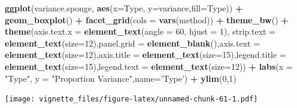 \documentclass[]{book}
\newenvironment{Shaded}{\begin{snugshade}}{\end{snugshade}}
\newcommand{\KeywordTok}[1]{\textcolor[rgb]{0.13,0.29,0.53}{\textbf{#1}}}
\newcommand{\DataTypeTok}[1]{\textcolor[rgb]{0.13,0.29,0.53}{#1}}
\newcommand{\DecValTok}[1]{\textcolor[rgb]{0.00,0.00,0.81}{#1}}
\newcommand{\StringTok}[1]{\textcolor[rgb]{0.31,0.60,0.02}{#1}}
\newcommand{\OperatorTok}[1]{\textcolor[rgb]{0.81,0.36,0.00}{\textbf{#1}}}
\newcommand{\NormalTok}[1]{#1}
\begin{document}
\begin{Shaded}
\begin{Highlighting}[]
\KeywordTok{ggplot}\NormalTok{(variance.sponge, }\KeywordTok{aes}\NormalTok{(}\DataTypeTok{x=}\NormalTok{Type, }\DataTypeTok{y=}\NormalTok{variance,}\DataTypeTok{fill=}\NormalTok{Type)) }\OperatorTok{+}\StringTok{ }\KeywordTok{geom_boxplot}\NormalTok{() }\OperatorTok{+}\StringTok{ }\KeywordTok{facet_grid}\NormalTok{(}\DataTypeTok{cols =} \KeywordTok{vars}\NormalTok{(method)) }\OperatorTok{+}\StringTok{ }\KeywordTok{theme_bw}\NormalTok{() }\OperatorTok{+}\StringTok{ }\KeywordTok{theme}\NormalTok{(}\DataTypeTok{axis.text.x =} \KeywordTok{element_text}\NormalTok{(}\DataTypeTok{angle =} \DecValTok{60}\NormalTok{, }\DataTypeTok{hjust =} \DecValTok{1}\NormalTok{), }\DataTypeTok{strip.text =} \KeywordTok{element_text}\NormalTok{(}\DataTypeTok{size=}\DecValTok{12}\NormalTok{),}\DataTypeTok{panel.grid =} \KeywordTok{element_blank}\NormalTok{(),}\DataTypeTok{axis.text =} \KeywordTok{element_text}\NormalTok{(}\DataTypeTok{size=}\DecValTok{12}\NormalTok{),}\DataTypeTok{axis.title =} \KeywordTok{element_text}\NormalTok{(}\DataTypeTok{size=}\DecValTok{15}\NormalTok{),}\DataTypeTok{legend.title =} \KeywordTok{element_text}\NormalTok{(}\DataTypeTok{size=}\DecValTok{15}\NormalTok{),}\DataTypeTok{legend.text =} \KeywordTok{element_text}\NormalTok{(}\DataTypeTok{size=}\DecValTok{12}\NormalTok{)) }\OperatorTok{+}\StringTok{ }\KeywordTok{labs}\NormalTok{(}\DataTypeTok{x =} \StringTok{"Type"}\NormalTok{, }\DataTypeTok{y =} \StringTok{"Proportion Variance"}\NormalTok{,}\DataTypeTok{name=}\StringTok{'Type'}\NormalTok{) }\OperatorTok{+}\StringTok{ }\KeywordTok{ylim}\NormalTok{(}\DecValTok{0}\NormalTok{,}\DecValTok{1}\NormalTok{)}
\end{Highlighting}
\end{Shaded}

\texttt{[image: vignette\_files/figure-latex/unnamed-chunk-61-1.pdf]}
\end{document}
